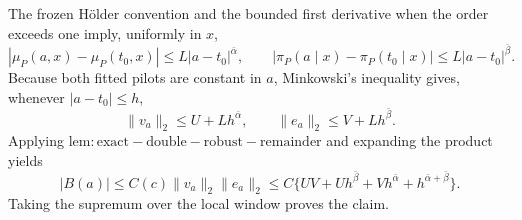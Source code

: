 The frozen Hölder convention and the bounded first derivative when the order exceeds one imply, uniformly in \(x\),
\[
|\mu_P(a,x)-\mu_P(t_0,x)|\le L|a-t_0|^{\bar\alpha},
\qquad
|\pi_P(a\mid x)-\pi_P(t_0\mid x)|\le L|a-t_0|^{\bar\beta}.
\]
Because both fitted pilots are constant in \(a\), Minkowski's inequality gives, whenever \(|a-t_0|\le h\),
\[
\|v_a\|_2\le U+Lh^{\bar\alpha},
\qquad
\|e_a\|_2\le V+Lh^{\bar\beta}.
\]
Applying \(\mathrm{lem:exact-double-robust-remainder}\) and expanding the product yields
\[
|B(a)|\le C(c)\|v_a\|_2\|e_a\|_2
\le C\{UV+Uh^{\bar\beta}+Vh^{\bar\alpha}+h^{\bar\alpha+\bar\beta}\}.
\]
Taking the supremum over the local window proves the claim.